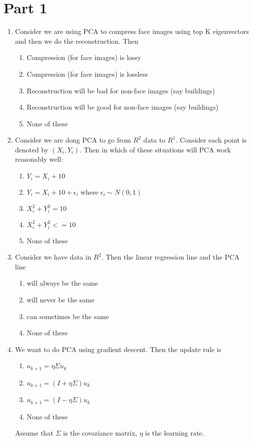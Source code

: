 \documentclass{article}
\begin{document}
\section{Part 1}
\begin{enumerate}
    \item Consider we are using PCA to compress face images using top K eigenvectors and then we do the reconstruction. Then
    \begin{enumerate}
        \item Compression (for face images) is lossy
        \item Compression (for face images) is lossless
        \item Reconstruction will be bad for non-face images (say buildings)
        \item Reconstruction will be good for non-face images (say buildings)
        \item None of these
    \end{enumerate}

    \item Consider we are dong PCA to go from $R^2$ data to $R^1$. Consider each point is denoted by $(X_i,Y_i)$. Then in which of these situations will PCA work reasonably well:
    \begin{enumerate}
        \item $Y_i=X_i+10$
        \item $Y_i=X_i+10+\epsilon_i$ where $\epsilon_i\sim N(0,1)$
        \item $X_i^2+Y_i^2 = 10$
        \item $X_i^2+Y_i^2 <= 10$
        \item None of these
    \end{enumerate}

    \item Consider we have data in $R^2$. Then the linear regression line and the PCA line
    \begin{enumerate}
        \item will always be the same
        \item will never be the same
        \item can sometimes be the same
        \item None of these
    \end{enumerate}

    \item We want to do PCA using gradient descent. Then the update rule is
    \begin{enumerate}
        \item $u_{k+1} = \eta\Sigma u_k$
        \item $u_{k+1} = (I+\eta\Sigma)u_k$
        \item $u_{k+1} = (I-\eta\Sigma)u_k$
        \item None of these
    \end{enumerate}
    Assume that $\Sigma$ is the covariance matrix, $\eta$ is the learning rate.


\end{enumerate}
\end{document}
